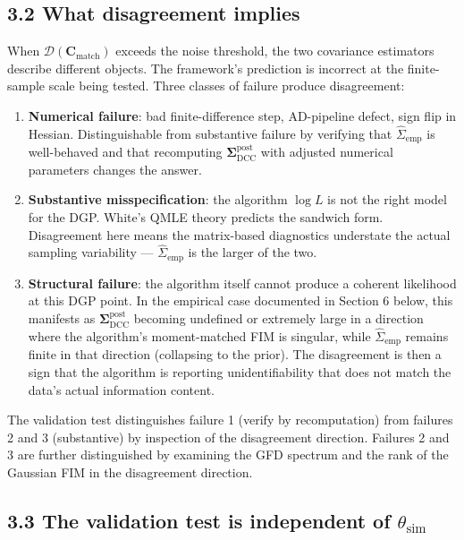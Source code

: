 \documentclass[11pt]{article}
\begin{document}
\subsection*{3.2 What disagreement implies}

When $\mathcal D(\mathbf C_{\mathrm{match}})$ exceeds the noise
threshold, the two covariance estimators describe different objects.
The framework's prediction is incorrect at the finite-sample scale
being tested. Three classes of failure produce disagreement:

\begin{enumerate}
\item \textbf{Numerical failure}: bad finite-difference step, AD-pipeline
  defect, sign flip in Hessian. Distinguishable from substantive failure
  by verifying that $\widehat\Sigma_{\mathrm{emp}}$ is well-behaved and
  that recomputing $\boldsymbol\Sigma_{\mathrm{DCC}}^{\mathrm{post}}$
  with adjusted numerical parameters changes the answer.
\item \textbf{Substantive misspecification}: the algorithm $\log L$ is
  not the right model for the DGP. White's QMLE theory predicts the
  sandwich form. Disagreement here means the matrix-based diagnostics
  understate the actual sampling variability ---
  $\widehat\Sigma_{\mathrm{emp}}$ is the larger of the two.
\item \textbf{Structural failure}: the algorithm itself cannot produce
  a coherent likelihood at this DGP point. In the empirical case
  documented in Section 6 below, this manifests as
  $\boldsymbol\Sigma_{\mathrm{DCC}}^{\mathrm{post}}$ becoming undefined
  or extremely large in a direction where the algorithm's
  moment-matched FIM is singular, while
  $\widehat\Sigma_{\mathrm{emp}}$ remains finite in that direction
  (collapsing to the prior). The disagreement is then a sign that the
  algorithm is reporting unidentifiability that does not match the
  data's actual information content.
\end{enumerate}

The validation test distinguishes failure 1 (verify by recomputation)
from failures 2 and 3 (substantive) by inspection of the disagreement
direction. Failures 2 and 3 are further distinguished by examining the
GFD spectrum and the rank of the Gaussian FIM in the disagreement
direction.

\subsection*{3.3 The validation test is independent of $\theta_{\mathrm{sim}}$}
\end{document}
